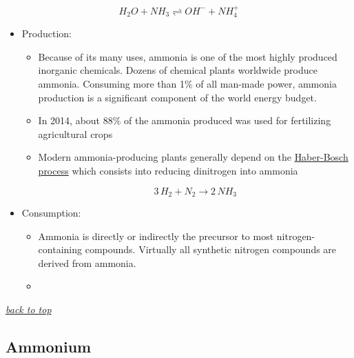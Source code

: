 \documentclass[]{book}
\providecommand{\tightlist}{%
  \setlength{\itemsep}{0pt}\setlength{\parskip}{0pt}}
\theoremstyle{definition}
\theoremstyle{definition}
\theoremstyle{definition}
\theoremstyle{remark}
\begin{document}
\[
H_2O + NH_3 \rightleftharpoons OH^{-} + NH_4^{+}
\]

\begin{itemize}
\tightlist
\item
  Production:

  \begin{itemize}
  \item
    Because of its many uses, ammonia is one of the most highly produced
    inorganic chemicals. Dozens of chemical plants worldwide produce
    ammonia. Consuming more than 1\% of all man-made power, ammonia
    production is a significant component of the world energy budget.
  \item
    In 2014, about 88\% of the ammonia produced was used for fertilizing
    agricultural crops
  \item
    Modern ammonia-producing plants generally depend on the
    \protect\hyperlink{haber-bosch}{Haber-Bosch process} which consists
    into reducing dinitrogen into ammonia

    \[
    3\,H_2 + N_2 \to 2\,NH_3
    \]
  \end{itemize}
\item
  Consumption:

  \begin{itemize}
  \item
    Ammonia is directly or indirectly the precursor to most
    nitrogen-containing compounds. Virtually all synthetic nitrogen
    compounds are derived from ammonia.
  \item
  \end{itemize}
\end{itemize}

\emph{\protect\hyperlink{top}{back to top}}

\subsection{Ammonium}\label{ammonium}
\end{document}
